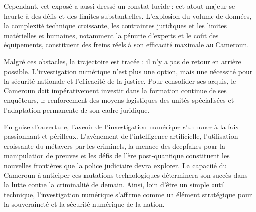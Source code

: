 \documentclass[12pt,a4paper]{article}
\begin{document}
Cependant, cet exposé a aussi dressé un constat lucide : cet atout majeur se heurte à des défis et des limites substantielles. L'explosion du volume de données, la complexité technique croissante, les contraintes juridiques et les limites matérielles et humaines, notamment la pénurie d'experts et le coût des équipements, constituent des freins réels à son efficacité maximale au Cameroun.

Malgré ces obstacles, la trajectoire est tracée : il n'y a pas de retour en arrière possible. L'investigation numérique n'est plus une option, mais une nécessité pour la sécurité nationale et l'efficacité de la justice. Pour consolider ses acquis, le Cameroun doit impérativement investir dans la formation continue de ses enquêteurs, le renforcement des moyens logistiques des unités spécialisées et l'adaptation permanente de son cadre juridique.

En guise d'ouverture, l'avenir de l'investigation numérique s'annonce à la fois passionnant et périlleux. L'avènement de l'intelligence artificielle, l'utilisation croissante du métavers par les criminels, la menace des deepfakes pour la manipulation de preuves et les défis de l'ère post-quantique constituent les nouvelles frontières que la police judiciaire devra explorer. La capacité du Cameroun à anticiper ces mutations technologiques déterminera son succès dans la lutte contre la criminalité de demain. Ainsi, loin d'être un simple outil technique, l'investigation numérique s'affirme comme un élément stratégique pour la souveraineté et la sécurité numérique de la nation.
\end{document}
